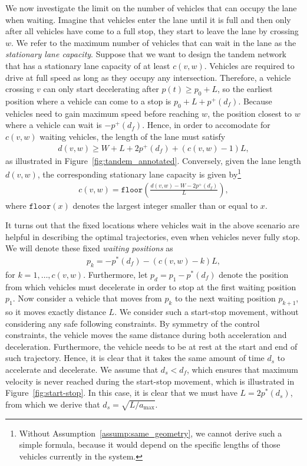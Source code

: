 \documentclass[a4paper]{article}
\theoremstyle{definition}
\theoremstyle{plain}
\begin{document}
We now investigate the limit on the number of vehicles that can occupy the lane
when waiting. Imagine that vehicles enter the lane until it is full and then
only after all vehicles have come to a full stop, they start to leave the lane
by crossing $w$. We refer to the maximum number of vehicles that can wait in the
lane as the \textit{stationary lane capacity}.
%
Suppose that we want to design the tandem network that has a stationary lane
capacity of at least $c(v,w)$. Vehicles are required to drive at full speed as
long as they occupy any intersection. Therefore, a vehicle crossing $v$ can only
start decelerating after $p(t) \geq p_{0} + L$, so the earliest position where a
vehicle can come to a stop is $p_{0} + L + p^{+}(d_{f})$.
%
Because vehicles need to gain maximum speed before reaching $w$,
the position closest to $w$ where a vehicle can wait is $- p^{+}(d_{f})$.
%
Hence, in order to accomodate for $c(v,w)$ waiting vehicles, the length of the
lane must satisfy
\begin{align*}
  d(v, w) \geq W + L + 2p^{+}(d_{f}) + (c(v,w) - 1) L ,
\end{align*}
as illustrated in Figure~\ref{fig:tandem_annotated}.
%
Conversely, given the lane length $d(v,w)$, the corresponding stationary lane
capacity is given by\footnote{Without Assumption~\ref{assump:same_geometry}, we
  cannot derive such a simple formula, because it would depend on the specific
  lengths of those vehicles currently in the system.}
\begin{align*}
  c(v, w) = \texttt{floor}\left( \frac{d(v,w) - W - 2 p^{+}(d_{f})}{L} \right) ,
\end{align*}
where $\texttt{floor}(x)$ denotes the largest integer smaller than or equal to
$x$.

{\color{Navy}
It turns out that the fixed locations where vehicles wait in the above scenario
are helpful in describing the optimal trajectories, even when vehicles never
fully stop. We will denote these fixed \textit{waiting positions} as
\begin{align*}
  p_{k} = - p^{*}(d_{f}) - (c(v,w) - k) L,
\end{align*}
for $k = 1, \dots, c(v,w)$.
%
Furthermore, let $p_{d} = p_{1} - p^{*}(d_{f})$ denote the position from
which vehicles must decelerate in order to stop at the first waiting position
$p_{1}$.
%
Now consider a vehicle that moves from $p_{k}$ to the next waiting position
$p_{k+1}$, so it moves exactly distance $L$. We consider such a start-stop
movement, without considering any safe following constraints. By symmetry of the
control constraints, the vehicle moves the same distance during both
acceleration and deceleration. Furthermore, the vehicle needs to be at rest at
the start and end of such trajectory. Hence, it is clear that it takes the same
amount of time $d_{s}$ to accelerate and decelerate. We assume that
$d_{s} < d_{f}$, which ensures that maximum velocity is never reached during the
start-stop movement, which is illustrated in Figure~\ref{fig:start-stop}. In this case, it is
clear that we must have $L = 2 p^{*}(d_{s})$, from which we derive that
$d_{s} = \sqrt{L / a_{\max}}$.
}
\end{document}
